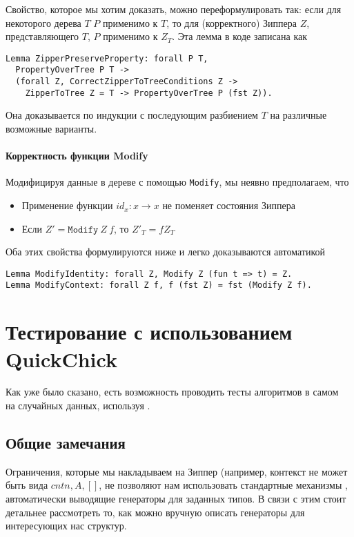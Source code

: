 Свойство, которое мы хотим доказать, можно переформулировать так: если для некоторого дерева $T$ $P$ применимо к $T$, то для (корректного) Зиппера $Z$, представляющего $T$, $P$ применимо к $Z_T$. Эта лемма в коде записана как
\begin{lstlisting}
Lemma ZipperPreserveProperty: forall P T,
  PropertyOverTree P T ->
  (forall Z, CorrectZipperToTreeConditions Z ->
    ZipperToTree Z = T -> PropertyOverTree P (fst Z)).
\end{lstlisting}
Она доказывается по индукции с последующим разбиением $T$ на различные возможные варианты.

\paragraph{Корректность функции Modify}

Модифицируя данные в дереве с помощью \texttt{Modify}, мы неявно предполагаем, что
\begin{itemize}
\item Применение функции $id_x : x \rightarrow x$ не поменяет состояния Зиппера
\item Если $Z' = \texttt{Modify}\ Z\ f$, то $Z'_T = f Z_T$
\end{itemize}

Оба этих свойства формулируются ниже и легко доказываются автоматикой \tcoq
\begin{lstlisting}
Lemma ModifyIdentity: forall Z, Modify Z (fun t => t) = Z.
Lemma ModifyContext: forall Z f, f (fst Z) = fst (Modify Z f).
\end{lstlisting}

\section{Тестирование с использованием QuickChick}

Как уже было сказано, есть возможность проводить тесты алгоритмов в самом \tcoq~ на случайных данных, используя \tqc.

\subsection{Общие замечания}

Ограничения, которые мы накладываем на Зиппер (например, контекст не может быть вида $cnt n, A, [
]$, не позволяют нам использовать стандартные механизмы \tqc, автоматически выводящие генераторы для заданных типов. В связи с этим стоит детальнее рассмотреть то, как можно вручную описать генераторы для интересующих нас структур.

